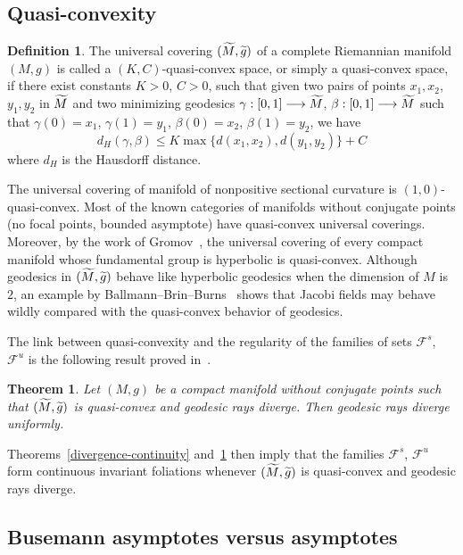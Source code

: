 \documentclass[10pt]{amsart}
\newtheorem{theo}[cdrthm]{Theorem}
\theoremstyle{definition}
\newtheorem{defi}[cdrthm]{Definition}
\newcommand{\clF}{\mathcal{F}}
\let\oldtilde\tilde
\renewcommand*{\tilde}[1]{\mathchoice{\widetilde{#1}}{\widetilde{#1}}{\oldtilde{#1}}{\oldtilde{#1}}}
\begin{document}
\subsection{Quasi-convexity}

\begin{defi}\label{quasi-convexity}
The universal covering $(\tilde{M}, \tilde{g})$ of a complete Riemannian manifold $(M,g)$ is called a $(K,C)$-quasi-convex space, or simply a quasi-convex space, if there exist constants $K>0$, $C>0$, such that given two pairs of points $x_{1}, x_{2}$, $y_{1},y_{2}$ in $\tilde{M}$ and two minimizing geodesics $\gamma:[0,1] \longrightarrow \tilde{M}$, $\beta:[0,1] \longrightarrow \tilde{M}$ such that $\gamma(0)= x_{1}$, $\gamma(1)= y_{1}$, $\beta(0) = x_{2}$, $\beta(1)= y_{2}$, we have
\[
d_{H}(\gamma, \beta) \leq K\max\{ d(x_{1},x_{2}), d(y_{1},y_{2})\} + C
\]
where $d_{H}$ is the Hausdorff distance.
\end{defi}

The universal covering of manifold of nonpositive sectional curvature is $(1,0)$-quasi-convex. Most of the known categories of manifolds without conjugate points (no focal points, bounded asymptote) have quasi-convex universal coverings. Moreover, by the work of Gromov~\cite{kn:Gromov}, the universal covering of every compact manifold whose fundamental group is hyperbolic is quasi-convex. Although geodesics in $(\tilde{M},\tilde{g})$ behave like hyperbolic geodesics when the dimension of $M$ is $2$, an example by Ballmann--Brin--Burns~\cite{kn:BBB} shows that Jacobi fields may behave wildly compared with the quasi-convex behavior of geodesics.

The link between quasi-convexity and the regularity of the families of sets $\clF^{s}$, $\clF^{u}$ is the following result proved in~\cite{kn:Ruggiero-Ensaios}.

\begin{theo}\label{quasi-conv-continuity}
Let $(M,g)$ be a compact manifold without conjugate points such that $(\tilde{M}, \tilde{g})$ is quasi-convex and geodesic rays diverge. Then geodesic rays diverge uniformly.
\end{theo}

Theorems~\ref{divergence-continuity} and~\ref{quasi-conv-continuity} then imply that the families $\clF^{s}$, $\clF^{u}$ form continuous invariant foliations whenever $(\tilde{M}, \tilde{g})$ is quasi-convex and geodesic rays diverge.


\subsection{Busemann asymptotes versus asymptotes}
\end{document}
